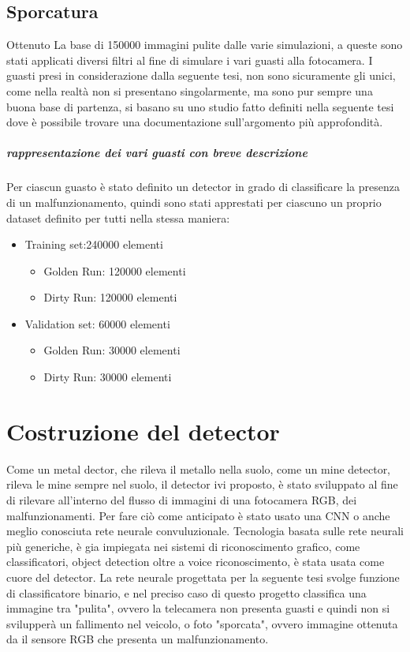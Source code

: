 \documentclass[14pt]{extarticle}
\begin{document}
\subsection{Sporcatura}

Ottenuto La base di 150000 immagini pulite dalle varie simulazioni, a queste sono stati applicati diversi filtri al fine di simulare i vari guasti alla fotocamera.
I guasti presi in considerazione dalla seguente tesi,  non sono sicuramente gli unici, come nella realtà non si presentano singolarmente, ma sono pur sempre una buona base di partenza, si basano su uno studio fatto definiti nella seguente tesi \cite{secci2020failures} dove è possibile trovare una documentazione sull'argomento più approfondità.
\subparagraph{rappresentazione dei vari guasti con breve descrizione}




Per ciascun guasto è stato definito un detector in grado di classificare la presenza di un malfunzionamento, quindi sono stati apprestati per ciascuno un proprio dataset definito per tutti nella stessa maniera:
\begin{itemize}
\item Training set:240000 elementi
\begin{itemize}
\item Golden Run: 120000 elementi
\item Dirty Run: 120000 elementi
\end{itemize}
\item Validation set: 60000 elementi
\begin{itemize}
\item Golden Run: 30000 elementi
\item Dirty Run: 30000 elementi
\end{itemize}
\end{itemize}


\section{Costruzione del detector}
Come un metal dector, che rileva il metallo nella suolo, come un mine detector, rileva le mine sempre nel suolo, il detector ivi proposto, è stato sviluppato al fine di rilevare all'interno del flusso di immagini di una fotocamera RGB, dei malfunzionamenti.
Per fare ciò come anticipato è stato usato una CNN o anche meglio conosciuta  rete neurale convuluzionale.
Tecnologia basata sulle rete neurali più generiche, è gia impiegata nei sistemi di riconoscimento grafico, come classificatori, object detection oltre a voice riconoscimento, è stata usata come cuore del detector. 
La rete neurale progettata per la seguente tesi svolge funzione di classificatore binario, e nel preciso caso di questo progetto classifica una immagine tra "pulita", ovvero la telecamera non presenta guasti e quindi non si svilupperà un fallimento nel veicolo,  o foto "sporcata", ovvero immagine ottenuta da il sensore RGB che presenta un malfunzionamento.
\end{document}
